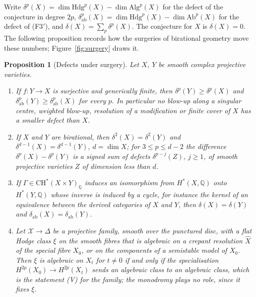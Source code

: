 \documentclass[11pt,reqno]{amsart}
\numberwithin{equation}{section}
\theoremstyle{plain}
\newtheorem{proposition}[theorem]{Proposition}
\theoremstyle{definition}
\newcommand{\QQ}{\mathbb{Q}}
\newcommand{\Hdg}{\mathrm{Hdg}}
\newcommand{\Ab}{\mathrm{Ab}}
\newcommand{\Alg}{\mathrm{Alg}}
\newcommand{\Fiii}{\texorpdfstring{\textup{(F3$'$)}}{(F3')}}
\begin{document}
Write $\delta^{p}(X)=\dim\Hdg^{p}(X)-\dim\Alg^{p}(X)$ for the defect of the conjecture in degree $2p$, $\delta_{\mathrm{ab}}^{p}(X)=\dim\Hdg^{p}(X)-\dim\Ab^{p}(X)$ for the defect of \Fiii{}, and $\delta(X)=\sum_{p}\delta^{p}(X)$. The conjecture for $X$ is $\delta(X)=0$. The following proposition records how the surgeries of birational geometry move these numbers; Figure~\ref{fig:surgery} draws it.

\begin{proposition}[Defects under surgery]\label{prop:surgery}
Let $X$, $Y$ be smooth complex projective varieties.
\begin{enumerate}[label=\textup{(\roman*)},leftmargin=2.4em,itemsep=2pt]
\item If $f\colon Y\to X$ is surjective and generically finite, then $\delta^{p}(Y)\ge\delta^{p}(X)$ and $\delta^{p}_{\mathrm{ab}}(Y)\ge\delta^{p}_{\mathrm{ab}}(X)$ for every $p$. In particular no blow-up along a singular centre, weighted blow-up, resolution of a modification or finite cover of $X$ has a smaller defect than $X$.
\item If $X$ and $Y$ are birational, then $\delta^{2}(X)=\delta^{2}(Y)$ and $\delta^{d-1}(X)=\delta^{d-1}(Y)$, $d=\dim X$; for $3\le p\le d-2$ the difference $\delta^{p}(X)-\delta^{p}(Y)$ is a signed sum of defects $\delta^{p-j}(Z)$, $j\ge1$, of smooth projective varieties $Z$ of dimension less than $d$.
\item If $\Gamma\in\mathrm{CH}^{*}(X\times Y)_{\QQ}$ induces an isomorphism from $H^{*}(X,\QQ)$ onto $H^{*}(Y,\QQ)$ whose inverse is induced by a cycle, for instance the kernel of an equivalence between the derived categories of $X$ and $Y$, then $\delta(X)=\delta(Y)$ and $\delta_{\mathrm{ab}}(X)=\delta_{\mathrm{ab}}(Y)$.
\item Let $\mathcal{X}\to\Delta$ be a projective family, smooth over the punctured disc, with a flat Hodge class $\xi$ on the smooth fibres that is algebraic on a crepant resolution $\hat X$ of the special fibre $X_{0}$, or on the components of a semistable model of $X_{0}$. Then $\xi$ is algebraic on $X_{t}$ for $t\ne0$ if and only if the specialisation $H^{2p}(X_{0})\to H^{2p}(X_{t})$ sends an algebraic class to an algebraic class, which is the statement (V) for the family; the monodromy plays no role, since it fixes $\xi$.
\end{enumerate}
\end{proposition}
\end{document}
